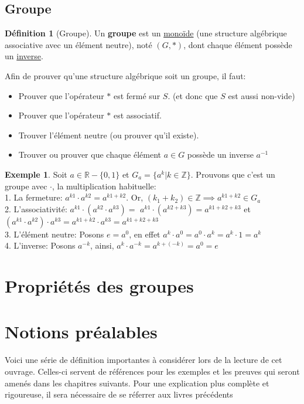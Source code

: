 \documentclass[12pt]{book}
\let\Bbb\mathbb
\def\sep{\phantom{}}
\theoremstyle{definition}
\newtheorem{definition}{Définition}[section]
\newtheorem*{example}{Exemple}
\begin{document}
\section{Groupe}
\begin{definition}[Groupe]
    \label{def:groupe}
    Un \textbf{groupe} est un \hyperref[def:monoide]{monoïde} (une structure algébrique associative avec un élément neutre), noté $(G, \ast)$, dont chaque élément possède un \hyperref[def:inverse]{inverse}.
\end{definition}
Afin de prouver qu'une structure algébrique soit un groupe, il faut:
\begin{itemize}
    \item Prouver que l'opérateur $\ast$ est fermé sur $S$. (et donc que $S$ est aussi non-vide)
    \item Prouver que l'opérateur $\ast$ est associatif.
    \item Trouver l'élément neutre (ou prouver qu'il existe).
    \item Trouver ou prouver que chaque élément $a \in G$ possède un inverse $a^{-1}$
\end{itemize}
\begin{example}
    Soit $a \in \Bbb R - \{0, 1\}$ et $G_a = \{a^k | k \in \Bbb Z\}$. Prouvons que c'est un groupe avec $\cdot$, la multiplication habituelle: \sep \\
    1. La fermeture: $a^{k1} \cdot a^{k2} = a^{k1 + k2}$. Or, $(k_1 + k_2) \in \Bbb Z \implies a^{k1 + k2} \in G_a$ \sep \\
    2. L'associativité: $a^{k1} \cdot (a^{k2} \cdot a^{k3}) =$ \sep 
    $a^{k1} \cdot (a^{k2 + k3}) = a^{k1 + k2 + k3}$ et \sep 
    $(a^{k1} \cdot a^{k2}) \cdot a^{k3} = a^{k1 + k2} \cdot a^{k3} = a^{k1 + k2 + k3}$ \sep \\
    3. L'élément neutre: Posons $e = a^0$, en effet $a^k \cdot a^0 = a^0 \cdot a^k = a^k \cdot 1 = a^k$ \sep \\
    4. L'inverse: Posons $a^{-k}$, ainsi, $a^k \cdot a^{-k} = a^{k + (-k)} = a^0 = e$ 
\end{example}

\chapter{Propriétés des groupes}
\appendix
\chapter{Notions préalables}
Voici une série de définition importantes à considérer lors de la lecture de cet ouvrage. Celles-ci servent
de références pour les exemples et les preuves qui seront amenés dans les chapitres suivants. Pour une explication
plus complète et rigoureuse, il sera nécessaire de se réferrer aux livres précédents
\end{document}
